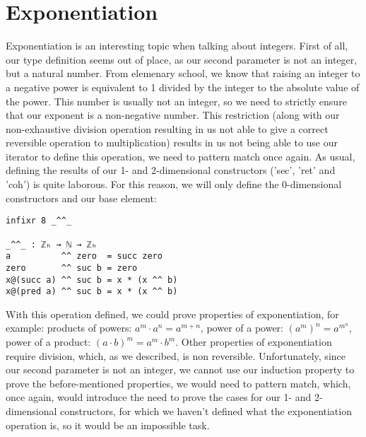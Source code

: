 \section{Exponentiation}
Exponentiation is an interesting topic when talking about integers. First of all, our type definition seems out of place, as our second parameter is not an integer, but a natural number. From elemenary school, we know that raising an integer to a negative power is equivalent to 1 divided by the integer to the absolute value of the power. This number is usually not an integer, so we need to strictly ensure that our exponent is a non-negative number.
This restriction (along with our non-exhaustive division operation resulting in us not able to give a correct reversible operation to multiplication) results in us not being able to use our iterator to define this operation, we need to pattern match once again.
As usual, defining the results of our 1- and 2-dimensional constructors ('sec', 'ret' and 'coh') is quite laborous. For this reason, we will only define the 0-dimensional constructors and our base element:
\begin{verbatim}
infixr 8 _^^_

_^^_ : ℤₕ → ℕ → ℤₕ
a          ^^ zero  = succ zero
zero       ^^ suc b = zero
x@(succ a) ^^ suc b = x * (x ^^ b)
x@(pred a) ^^ suc b = x * (x ^^ b)
\end{verbatim}
With this operation defined, we could prove properties of exponentiation, for example: products of powers: $a^m \cdot a^n = a^{m+n}$, power of a power: $(a^m)^n = a^{m^n}$, power of a product: $(a \cdot b)^m = a^m \cdot b^m$.
Other properties of exponentiation require division, which, as we described, is non reversible.
Unfortunately, since our second parameter is not an integer, we cannot use our induction property to prove the before-mentioned properties, we would need to pattern match, which, once again, would introduce the need to prove the cases for our 1- and 2-dimensional constructors, for which we haven't defined what the exponentiation operation is, so it would be an impossible task.
